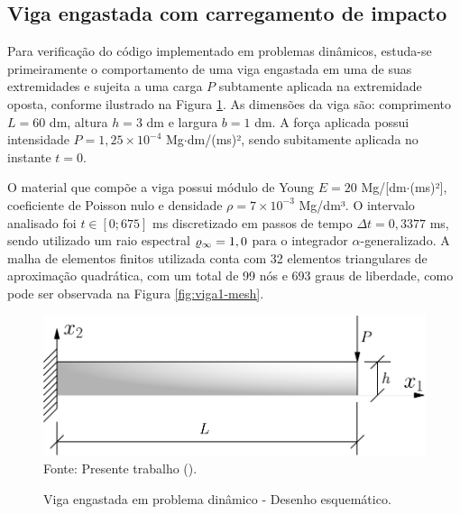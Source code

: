\subsection{Viga engastada com carregamento de impacto} \label{Ap:DinBeam}

Para verificação do código implementado em problemas dinâmicos, estuda-se  primeiramente o comportamento de uma viga engastada em uma de suas extremidades e sujeita a uma carga $P$ subtamente aplicada na extremidade oposta, conforme ilustrado na Figura \ref{fig:viga1}. As dimensões da viga são: comprimento $L=60$ dm, altura $h=3$ dm e largura $b=1$ dm. A força aplicada possui intensidade $P=1,25\times10^{-4}$ Mg$\cdot$dm/(ms)², sendo subitamente aplicada no instante $t=0$.

O material que compõe a viga possui módulo de Young $E=20$ Mg/[dm$\cdot$(ms)²], coeficiente de Poisson nulo e densidade $\rho=7\times10^{-3}$ Mg/dm³. O intervalo analisado foi $t\in[0;675]$ ms discretizado em passos de tempo $\Delta t=0,3377$ ms, sendo utilizado um raio espectral $\varrho_\infty=1,0$ para o integrador $\alpha$-generalizado. A malha de elementos finitos utilizada conta com 32 elementos triangulares de aproximação quadrática, com um total de 99 nós e 693 graus de liberdade, como pode ser observada na Figura \ref{fig:viga1-mesh}.

\begin{figure}[h!]
    \centering
    \caption{Viga engastada em problema dinâmico - Desenho esquemático.}
    \includegraphics[width=0.5\linewidth]{Figuras/vigas/viga1.pdf}
    \\Fonte: Presente trabalho (\the\year).
    \label{fig:viga1}
\end{figure}

